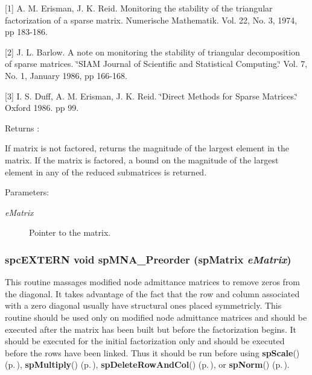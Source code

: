 [1] A. M. Erisman, J. K. Reid. Monitoring the stability of the triangular factorization of a sparse matrix. Numerische Mathematik. Vol. 22, No. 3, 1974, pp 183-186.

[2] J. L. Barlow. A note on monitoring the stability of triangular decomposition of sparse matrices. \char`\"{}SIAM Journal of Scientific and Statistical Computing.\char`\"{} Vol. 7, No. 1, January 1986, pp 166-168.

[3] I. S. Duff, A. M. Erisman, J. K. Reid. \char`\"{}Direct Methods for Sparse Matrices.\char`\"{} Oxford 1986. pp 99.

\begin{Desc}
\item[Returns :]\par
 If matrix is not factored, returns the magnitude of the largest element in the matrix. If the matrix is factored, a bound on the magnitude of the largest element in any of the reduced submatrices is returned.\end{Desc}
\begin{Desc}
\item[Parameters: ]\par
\begin{description}
\item[{\em 
e\-Matrix}]Pointer to the matrix. \end{description}
\end{Desc}
\subsubsection{\setlength{\rightskip}{0pt plus 5cm}spc\-EXTERN void sp\-MNA\_\-Preorder ({\bf sp\-Matrix} {\em e\-Matrix})}\label{spMatrix_8h_a44}


This routine massages modified node admittance matrices to remove zeros from the diagonal. It takes advantage of the fact that the row and column associated with a zero diagonal usually have structural ones placed symmetricly. This routine should be used only on modified node admittance matrices and should be executed after the matrix has been built but before the factorization begins. It should be executed for the initial factorization only and should be executed before the rows have been linked. Thus it should be run before using {\bf sp\-Scale}() {\rm (p.\,\pageref{spMatrix_8h_a51})}, {\bf sp\-Multiply}() {\rm (p.\,\pageref{spMatrix_8h_a58})}, {\bf sp\-Delete\-Row\-And\-Col}() {\rm (p.\,\pageref{spMatrix_8h_a25})}, or {\bf sp\-Norm}() {\rm (p.\,\pageref{spMatrix_8h_a45})}.


